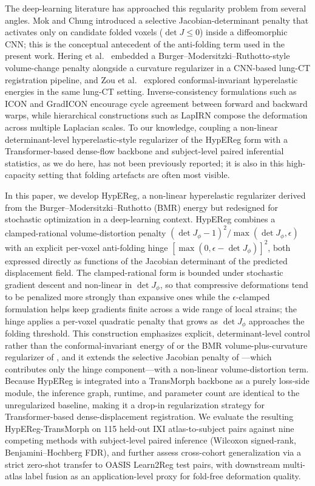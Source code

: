 \documentclass[jimaging,article,submit,pdftex,moreauthors]{Definitions/mdpi}
\begin{document}
The deep-learning literature has approached this regularity problem from several angles. Mok and Chung \cite{mok2020fast} introduced a selective Jacobian-determinant penalty that activates only on candidate folded voxels (\(\det J\le 0\)) inside a diffeomorphic CNN; this is the conceptual antecedent of the anti-folding term used in the present work. Hering et al.\ \cite{hering2021lung} embedded a Burger--Modersitzki--Ruthotto-style volume-change penalty alongside a curvature regularizer in a CNN-based lung-CT registration pipeline, and Zou et al.\ \cite{zou2023conformal} explored conformal-invariant hyperelastic energies in the same lung-CT setting. Inverse-consistency formulations such as ICON \cite{greer2021icon} and GradICON \cite{tian2023gradicon} encourage cycle agreement between forward and backward warps, while hierarchical constructions such as LapIRN \cite{mok2020lapirn} compose the deformation across multiple Laplacian scales. To our knowledge, coupling a non-linear determinant-level hyperelastic-style regularizer of the HypEReg form with a Transformer-based dense-flow backbone and subject-level paired inferential statistics, as we do here, has not been previously reported; it is also in this high-capacity setting that folding artefacts are often most visible.

In this paper, we develop HypEReg, a non-linear hyperelastic regularizer derived from the Burger--Modersitzki--Ruthotto (BMR) energy \cite{burger2013hyperelastic} but redesigned for stochastic optimization in a deep-learning context. HypEReg combines a clamped-rational volume-distortion penalty \((\det J_\phi-1)^2/\max(\det J_\phi,\epsilon)\) with an explicit per-voxel anti-folding hinge \([\max(0,\epsilon-\det J_\phi)]^2\), both expressed directly as functions of the Jacobian determinant of the predicted displacement field. The clamped-rational form is bounded under stochastic gradient descent and non-linear in \(\det J_\phi\), so that compressive deformations tend to be penalized more strongly than expansive ones while the \(\epsilon\)-clamped formulation helps keep gradients finite across a wide range of local strains; the hinge applies a per-voxel quadratic penalty that grows as \(\det J_\phi\) approaches the folding threshold. This construction emphasizes explicit, determinant-level control rather than the conformal-invariant energy of \citet{zou2023conformal} or the BMR volume-plus-curvature regularizer of \citet{hering2021lung}, and it extends the selective Jacobian penalty of \citet{mok2020fast}---which contributes only the hinge component---with a non-linear volume-distortion term. Because HypEReg is integrated into a TransMorph backbone as a purely loss-side module, the inference graph, runtime, and parameter count are identical to the unregularized baseline, making it a drop-in regularization strategy for Transformer-based dense-displacement registration. We evaluate the resulting HypEReg-TransMorph on 115 held-out IXI atlas-to-subject pairs against nine competing methods with subject-level paired inference (Wilcoxon signed-rank, Benjamini--Hochberg FDR), and further assess cross-cohort generalization via a strict zero-shot transfer to OASIS Learn2Reg test pairs, with downstream multi-atlas label fusion as an application-level proxy for fold-free deformation quality.
\end{document}
